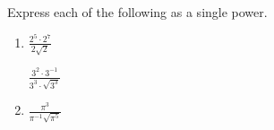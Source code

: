 Express each of the following as a single power.  

\begin{enumerate}
\item   $\displaystyle\frac{2^5\cdot 2^7}{2\sqrt{2}}$

  $\label{problemSimplify3^23^(-1)/(3^3sqrt(3^3))} \displaystyle\frac{3^2\cdot 3^{-1}}{3^3\cdot \sqrt{3^3}}$

\item   $\displaystyle \frac{\pi^3}{\pi^{-1}\sqrt{\pi^5}}$

\end{enumerate}
